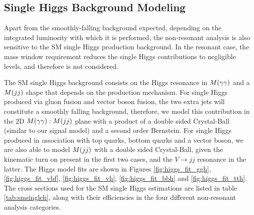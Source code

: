 \subsection{Single Higgs Background Modeling}

Apart from the smoothly-falling background expected, depending on the integrated luminosity with which it is performed, the non-resonant analysis is also sensitive to the SM single Higgs production background. 
In the resonant case, the mass window requirement reduces the single Higgs contributions to negligible levels, and therefore is not considered. 

The SM single Higgs background consists on the Higgs resonance in $M(\gamma\gamma)$ and a $M(jj)$ shape that depends on the production mechanism. 
For single Higgs produced via gluon fusion and vector boson fusion, the two extra jets will constitute a smoothly falling background, therefore, we model this contribution in the 2D $M(\gamma\gamma):M(jj)$ plane with a product of a double sided Crystal-Ball (similar to our signal model)  and a second order Bernstein. 
For single Higgs produced in association with top quarks, bottom quarks and a vector boson, we are also able to model $M(jj)$ with a double sided Crystal-Ball, given the kinematic turn on present in the first two cases, and the $V\rightarrow jj$ resonance in the latter.  
The Higgs model fits are shown in Figures \ref{fig:higgs_fit_ggh}, \ref{fig:higgs_fit_vbf}, \ref{fig:higgs_fit_vh}, \ref{fig:higgs_fit_bbh} and \ref{fig:higgs_fit_tth}.
The cross sections used for the SM single Higgs estimations are listed in table \ref{tab:smsingleh}, along with their efficiencies in the four different non-resonant analysis categories. 

